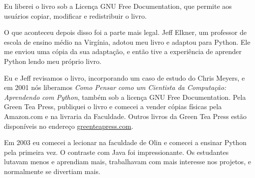 Eu liberei o livro sob a Licença GNU Free Documentation, que permite aos 
usuários copiar, modificar e redistribuir o livro.



O que aconteceu depois disso foi a parte mais legal. Jeff Elkner, um 
professor de escola de ensino médio na Virgínia, adotou meu livro e adaptou 
para Python. Ele me enviou uma cópia da sua adaptação, e então tive a 
experiência de aprender Python lendo meu próprio livro.


Eu e Jeff revisamos o livro, incorporando um caso de estudo do Chris Meyers, 
e em 2001 nós liberamos \emph{Como Pensar como um Cientista da Computação: 
Aprendendo com Python}, também sob a licença GNU Free Documentation.
Pela Green Tea Press, publiquei o livro e comecei a vender cópias físicas 
pela Amazon.com e na livraria da Faculdade. Outros livros da Green Tea Press 
estão disponíveis no endereço \url{greenteapress.com}.


Em 2003 eu comecei a lecionar na faculdade de Olin e comecei a ensinar Python 
pela primeira vez. O contraste com Java foi impressionante. Os estudantes 
lutavam menos e aprendiam mais, trabalhavam com mais interesse nos projetos,
e normalmente se divertiam mais.


